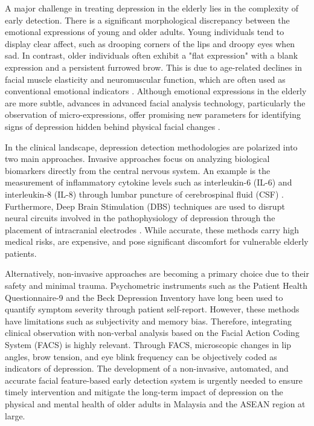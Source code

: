 A major challenge in treating depression in the elderly lies in the complexity of early detection. There is a significant morphological discrepancy between the emotional expressions of young and older adults. Young individuals tend to display clear affect, such as drooping corners of the lips and droopy eyes when sad. In contrast, older individuals often exhibit a "flat expression" with a blank expression and a persistent furrowed brow. This is due to age-related declines in facial muscle elasticity and neuromuscular function, which are often used as conventional emotional indicators \cite{Grondhuis2021}. Although emotional expressions in the elderly are more subtle, advances in advanced facial analysis technology, particularly the observation of micro-expressions, offer promising new parameters for identifying signs of depression hidden behind physical facial changes \cite{KimH2023}.

In the clinical landscape, depression detection methodologies are polarized into two main approaches. Invasive approaches focus on analyzing biological biomarkers directly from the central nervous system. An example is the measurement of inflammatory cytokine levels such as interleukin-6 (IL-6) and interleukin-8 (IL-8) through lumbar puncture of cerebrospinal fluid (CSF) \cite{Sorensen2023}. Furthermore, Deep Brain Stimulation (DBS) techniques are used to disrupt neural circuits involved in the pathophysiology of depression through the placement of intracranial electrodes \cite{Figee2022}. While accurate, these methods carry high medical risks, are expensive, and pose significant discomfort for vulnerable elderly patients.

Alternatively, non-invasive approaches are becoming a primary choice due to their safety and minimal trauma. Psychometric instruments such as the Patient Health Questionnaire-9 \cite{Kroenke2001} and the Beck Depression Inventory \cite{Martin2010} have long been used to quantify symptom severity through patient self-report. However, these methods have limitations such as subjectivity and memory bias. Therefore, integrating clinical observation with non-verbal analysis based on the Facial Action Coding System (FACS) is highly relevant. Through FACS, microscopic changes in lip angles, brow tension, and eye blink frequency can be objectively coded as indicators of depression. The development of a non-invasive, automated, and accurate facial feature-based early detection system is urgently needed to ensure timely intervention and mitigate the long-term impact of depression on the physical and mental health of older adults in Malaysia and the ASEAN region at large.



